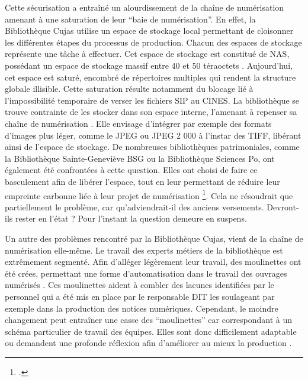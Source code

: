 Cette sécurisation a entraîné un alourdissement de la chaîne de numérisation amenant à une saturation de leur \enquote{baie de numérisation}. En effet, la Bibliothèque Cujas utilise un espace de stockage local permettant de cloisonner les différentes étapes du processus de production. Chacun des espaces de stockage représente une tâche à effectuer. Cet espace de stockage est constitué de \ac{NAS}, possédant un espace de stockage massif entre 40 et 50 téraoctets . Aujourd'hui, cet espace est saturé, encombré de répertoires multiples qui rendent la structure globale illisible. Cette saturation résulte notamment du blocage lié à l'impossibilité temporaire de verser les fichiers \ac{SIP} au \ac{CINES}. La bibliothèque se trouve contrainte de les stocker dans son espace interne, l'amenant à repenser sa chaîne de numérisation . Elle envisage d'intégrer par exemple des formats d'images plus léger, comme le \ac{JPEG} ou JPEG 2 000 à l'instar des \ac{TIFF}, libérant ainsi de l'espace de stockage. De nombreuses bibliothèques patrimoniales, comme la Bibliothèque Sainte-Geneviève \ac{BSG} ou la Bibliothèque Sciences Po, ont également été confrontées à cette question. Elles ont choisi de faire ce basculement afin de libérer l'espace, tout en leur permettant de réduire leur empreinte carbonne liée à leur projet de numérisation \footcite{creusotQuellesPerspectivesPour}. Cela ne résoudrait que partiellement le problème, car qu'adviendrait-il des anciens versements. Devront-ils rester en l'état ? Pour l'instant la question demeure en suspens. 

Un autre des problèmes rencontré par la Bibliothèque Cujas, vient de la chaîne de numérisation elle-même. Le travail des experts métiers de la bibliothèque est extrêmement segmenté. Afin d'alléger légèrement leur travail, des moulinettes ont été crées, permettant une forme d'automatisation dans le travail des ouvrages numérisés . Ces moulinettes aident à combler des lacunes identifiées par le personnel qui a été mis en place par le responsable \ac{DIT} les soulageant par exemple dans la production des notices numériques. Cependant, le moindre changement peut entraîner une casse des \enquote{moulinettes} car correspondant à un schéma particulier de travail des équipes. Elles sont donc difficilement adaptable ou demandent une profonde réflexion afin d'améliorer au mieux la production . 


